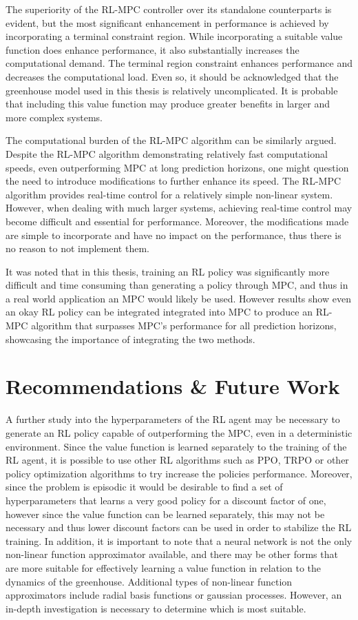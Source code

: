 The superiority of the RL-MPC controller over its standalone counterparts is evident, but the most significant enhancement in performance is achieved by incorporating a terminal constraint region. While incorporating a suitable value function does enhance performance, it also substantially increases the computational demand. The terminal region constraint enhances performance and decreases the computational load. Even so, it should be acknowledged that the greenhouse model used in this thesis is relatively uncomplicated. It is probable that including this value function may produce greater benefits in larger and more complex systems. 

The computational burden of the RL-MPC algorithm can be similarly argued. Despite the RL-MPC algorithm demonstrating relatively fast computational speeds, even outperforming MPC at long prediction horizons, one might question the need to introduce modifications to further enhance its speed. The RL-MPC algorithm provides real-time control for a relatively simple non-linear system. However, when dealing with much larger systems, achieving real-time control may become difficult and essential for performance. Moreover, the modifications made are simple to incorporate and have no impact on the performance, thus there is no reason to not implement them.

It was noted that in this thesis, training an RL policy was significantly more difficult and time consuming than generating a policy through MPC, and thus in a real world application an MPC would likely be used. However results show even an okay RL policy can be integrated integrated into MPC to produce an RL-MPC algorithm that surpasses MPC's performance for all prediction horizons, showcasing the importance of integrating the two methods.





\section{Recommendations \& Future Work}
A further study into the hyperparameters of the RL agent may be necessary to generate an RL policy capable of outperforming the MPC, even in a deterministic environment.  Since the value function is learned separately to the training of the RL agent, it is possible to use other RL algorithms such as PPO, TRPO or other policy optimization algorithms to try increase the policies performance. Moreover, since the problem is episodic it would be desirable to find a set of hyperparameters that learns a very good policy for a discount factor of one, however since the value function can be learned separately, this may not be necessary  and thus lower discount factors can be used in order to stabilize the RL training. In addition, it is important to note that a neural network is not the only non-linear function approximator available, and there may be other forms that are more suitable for effectively learning a value function in relation to the dynamics of the greenhouse. Additional types of non-linear function approximators include radial basis functions or gaussian processes. However, an in-depth investigation is necessary to determine which is most suitable.

